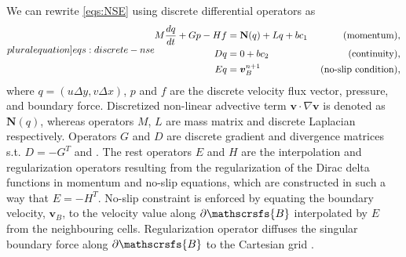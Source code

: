\documentclass{article}
\numberwithin{equation}{section}
\begin{document}
We can rewrite \cref{eqs:NSE} using discrete differential operators as 
\begin{equation}\label[pluralequation]{eqs:discrete-nse}
\begin{aligned}
	M\frac{dq}{dt} + Gp - Hf &= \mathbf{N}(q) + Lq + bc_1&\text{ (momentum),}\\
	Dq &= 0 + bc_2&\text{ (continuity),}\\
	Eq & = \boldsymbol{v}_B^{n+1} &\text{ (no-slip condition),}
	\end{aligned}
\end{equation}
where $q=(  u\Delta y,v\Delta x )$, $p$ and $f$ are the discrete velocity flux vector, pressure, and boundary force. Discretized non-linear advective term $\boldsymbol{v}\cdot\nabla \boldsymbol{v}$ is denoted as $\mathbf{N}(q)$, whereas operators $M$, $L$ are mass matrix and discrete Laplacian respectively. Operators $G$ and $D$ are discrete gradient and divergence matrices s.t. $D=-G^T$ and \cite{Chang:2002,Perot:1993}. The rest operators $E$ and $H$ are the interpolation and regularization operators resulting from the regularization of the Dirac delta functions in momentum and no-slip equations, which are constructed in such a way that $E=-H^T$. No-slip constraint is enforced by equating the boundary velocity, $\boldsymbol{v}_B$, to the velocity value along $\partial \mathscrsfs{B}$ interpolated by $E$ from the neighbouring cells. Regularization operator diffuses the singular boundary force along $\partial \mathscrsfs{B}$ to the Cartesian grid \cite{Colonius:2008}.  
\end{document}
